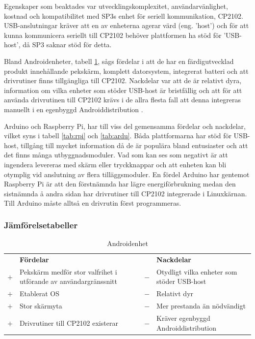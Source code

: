 \documentclass{article}
\begin{document}
            \noindent Egenskaper som beaktades var utvecklingskomplexitet, användarvänlighet, kostnad och kompatibilitet med SP3s enhet för seriell kommunikation, CP2102. USB-anslutningar kräver att en av enheterna agerar värd (eng. 'host') och för att kunna kommunicera seriellt till CP2102 behöver plattformen ha stöd för 'USB-host', då SP3 saknar stöd för detta. \bigskip
            
            \noindent Bland Androidenheter, tabell \ref{tab:android}, sågs fördelar i att de har en färdigutvecklad produkt innehållande pekskärm, komplett datorsystem, integrerat batteri och att drivrutiner finns tillgängliga till CP2102. Nackdelar var att de är relativt dyra, information om vilka enheter som stöder USB-host är bristfällig och att för att använda drivrutinen till CP2102 krävs i de allra flesta fall att denna integreras manuellt i en egenbyggd Androiddistribution \cite{SL_AN809}. \bigskip
            
            \noindent Arduino och Raspberry Pi, har till viss del gemensamma fördelar och nackdelar, vilket syns i tabell \ref{tab:rpi} och \ref{tab:ardu}. Båda plattformarna har stöd för USB-host, tillgång till mycket information då de är populära bland entusiaster och att det finns många utbyggnadsmoduler. Vad som kan ses som negativt är att ingendera levereras med skärm eller tryckknappar och att enheten kan bli otymplig vid anslutning av flera tilläggsmoduler. En fördel Arduino har gentemot Raspberry Pi är att den förstnämnda har lägre energiförbrukning medan den sistnämnda å andra sidan har drivrutiner till CP2102 integrerade i Linuxkärnan. Till Arduino måste alltså en drivrutin först programmeras.
            \enlargethispage{\baselineskip}

            \subsubsection{Jämförelsetabeller}
            \label{subsub:comptab}
            \begin{table}[ht]
                \caption{Androidenhet}\label{tab:android}
                \begin{tabularx}{\textwidth}{@{}cXcX}
                    & \textbf{Fördelar}     & & \textbf{Nackdelar} \\
                    $+$ & Pekskärm medför stor valfrihet i utförande av användargränssnitt     &                            $-$ & Otydligt vilka enheter som
                                                      stöder USB-host \\
                    $+$ &  Etablerat OS     &   $-$ & Relativt dyr \\
                    $+$ &  Stor skärmyta    &   $-$ & Mer prestanda än nödvändigt \\
                    $+$ &  Drivrutiner till CP2102 existerar &
                                                $-$ & Kräver egenbyggd Androiddistribution \\
                \end{tabularx}\\
            \end{table}
                
\end{document}
